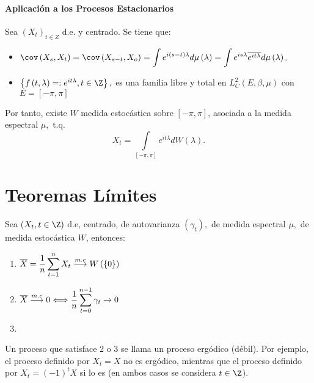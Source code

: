 \paragraph{Aplicaci\'{o}n a los Procesos Estacionarios}
Sea ${(X_{t})}_{t\in Z}$ d.e. y centrado. Se tiene que:

\begin{itemize}
\item $\displaystyle\cov\left( {X_{s} ,X_{t} } \right)=\cov\left( {X_{s-t} ,X_{o} } \right)=\int {e^{i\left( {s-t} \right)\lambda }d\mu \left( \lambda \right)=\int {e^{is\lambda }\overline {e^{it\lambda }} d\mu \left( \lambda \right)} } $. 
\item $\left\{ f\left(t,\lambda \right)=:e^{it\lambda }, t\in \Z \right\} ,$ es una familia libre y total en $L_{C}^{2} \left( {E,\beta ,\mu } \right)$ con $E=\left[ {-\pi ,\pi } \right]$
\end{itemize}

Por tanto, existe $W$ medida estoc\'{a}stica sobre $\left[ {-\pi ,\pi } \right]$, asociada a la medida espectral $\mu ,$ t.q.
\[
X_{t} =\int\limits_{\left[ {-\pi ,\pi } \right]} {e^{it\lambda }} dW\left( 
\lambda \right).
\]

\section{Teoremas L\'{i}mites}
\label{subsec:mylabel4}

\begin{teorema}
Sea ($X_{t} ,t\in \Z)$ d.e, centrado, de autovarianza $\left( {\gamma_{t} } \right),$ de medida espectral $\mu ,$ de medida estoc\'{a}stica $W$, 
entonces: 
\begin{enumerate}
 \item $\displaystyle\overline{X}=\frac{1}{n}\sum_{t=1}^n X_{t} \buildrel 
{m.c} \over \longrightarrow W\left( \left\{ 0 \right\} \right)$ 
\item $\displaystyle\overline X \buildrel {m.c} \over \longrightarrow 
0\Longleftrightarrow \frac{1}{n}\sum_{t=0}^{n-1} {\gamma_{t} } \to 
0$
\item 
\end{enumerate}

\end{teorema}

Un proceso que satisface 2 o 3 se llama un proceso erg\'{o}dico (d\'{e}bil). Por ejemplo, el proceso definido por $X_{t} =X$ no 
es erg\'{o}dico, mientras que el proceso definido por $X_{t} =\left( {-1} \right)^{t}X$ si lo es (en ambos casos se considera $t\in \Z$).

